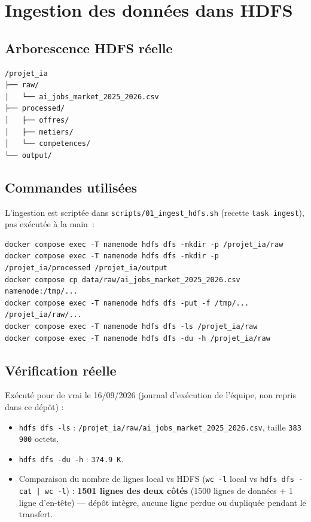 \chapter{Ingestion des données dans HDFS}

\section{Arborescence HDFS réelle}

\begin{verbatim}
/projet_ia
├── raw/
│   └── ai_jobs_market_2025_2026.csv
├── processed/
│   ├── offres/
│   ├── metiers/
│   └── competences/
└── output/
\end{verbatim}

\section{Commandes utilisées}

L'ingestion est scriptée dans \texttt{scripts/01\_ingest\_hdfs.sh}
(recette \texttt{task ingest}), pas exécutée à la main~:

\begin{verbatim}
docker compose exec -T namenode hdfs dfs -mkdir -p /projet_ia/raw
docker compose exec -T namenode hdfs dfs -mkdir -p /projet_ia/processed /projet_ia/output
docker compose cp data/raw/ai_jobs_market_2025_2026.csv namenode:/tmp/...
docker compose exec -T namenode hdfs dfs -put -f /tmp/... /projet_ia/raw/...
docker compose exec -T namenode hdfs dfs -ls /projet_ia/raw
docker compose exec -T namenode hdfs dfs -du -h /projet_ia/raw
\end{verbatim}

\section{Vérification réelle}

Exécuté pour de vrai le 16/09/2026 (journal d'exécution de l'équipe, non repris dans ce dépôt) :

\begin{itemize}[leftmargin=1.5em]
  \item \texttt{hdfs dfs -ls} : \texttt{/projet\_ia/raw/ai\_jobs\_market\_2025\_2026.csv},
    taille \texttt{383\,900} octets.
  \item \texttt{hdfs dfs -du -h} : \texttt{374.9 K}.
  \item Comparaison du nombre de lignes local vs HDFS
    (\texttt{wc -l} local vs \texttt{hdfs dfs -cat | wc -l}) :
    \textbf{1501 lignes des deux côtés} (1500 lignes de données + 1
    ligne d'en-tête) — dépôt intègre, aucune ligne perdue ou dupliquée
    pendant le transfert.
\end{itemize}
